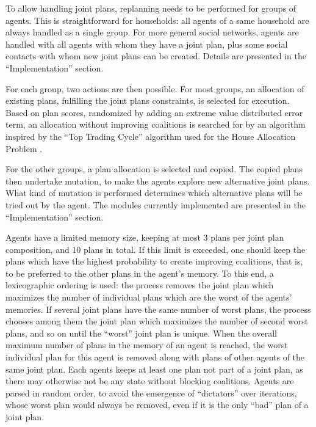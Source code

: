 {To allow handling joint plans, replanning needs to be performed for
groups of agents. This is straightforward for households: all agents of
a same household are always handled as a single group. For more general
social networks, agents are handled with all agents with whom they have
a joint plan, plus some social contacts with whom new joint plans can be
created. Details are presented in the ``Implementation'' section.

For each group, two actions are then possible. For most groups, an
allocation of existing plans, fulfilling the joint plans constraints, is
selected for execution. Based on plan scores, randomized by adding an
extreme value distributed error term, an allocation without improving
coalitions is searched for by an algorithm inspired by the ``Top Trading
Cycle'' algorithm used for the House Allocation Problem
\cite{SchummerVohra_NisanEtAl_2007}.

For the other groups, a plan allocation is selected and copied. The
copied plans then undertake mutation, to make the agents explore new
alternative joint plans. What kind of mutation is performed determines
which alternative plans will be tried out by the agent. The modules
currently implemented are presented in the ``Implementation'' section.

Agents have a limited memory size, keeping at most 3 plans per joint
plan composition, and 10 plans in total. If this limit is exceeded, one
should keep the plans which have the highest probability to create
improving coalitions, that is, to be preferred to the other plans in the
agent's memory. To this end, a lexicographic ordering is used: the
process removes the joint plan which maximizes the number of individual
plans which are the worst of the agents' memories. If several joint
plans have the same number of worst plans, the process chooses among
them the joint plan which maximizes the number of second worst plans,
and so on until the ``worst'' joint plan is unique. When the overall
maximum number of plans in the memory of an agent is reached, the worst
individual plan for this agent is removed along with plans of other
agents of the same joint plan. Each agents keeps at least one plan not
part of a joint plan, as there may otherwise not be any state without
blocking coalitions. Agents are parsed in random order, to avoid the
emergence of ``dictators'' over iterations, whose worst plan would
always be removed, even if it is the only ``bad'' plan of a joint plan.

}

